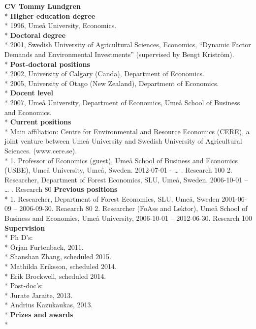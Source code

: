 \documentclass[10pt,a4paper]{article}
\begin{document}
\textbf{CV Tommy Lundgren}\\*
\textbf{Higher education degree}\\*
1996, Umeå University, Economics.\\*
\textbf{Doctoral degree}\\*
2001, Swedish University of Agricultural Sciences, Economics, “Dynamic Factor Demands and Environmental Investments” (supervised by Bengt Kriström).\\*
\textbf{Post-doctoral positions}\\*
2002, University of Calgary (Canda), Department of Economics.\\*
2005, University of Otago (New Zealand), Department of Economics.\\*
\textbf{Docent level}\\*
2007, Umeå University, Department of Economics, Umeå School of Business and Economics.\\*
\textbf{Current positions}\\*
Main affiliation: Centre for Environmental and Resource Economics (CERE), a joint venture between Umeå University and Swedish University of Agricultural Sciences. (www.cere.se).\\*
1. Professor of Economics (guest), Umeå School of Business and Economics (USBE), Umeå University, Umeå, Sweden. 2012-07-01 - …  . Research 100%
2. Researcher, Department of Forest Economics, SLU, Umeå, Sweden. 2006-10-01 – … . Research 80%
\textbf{Previous positions}\\*
1. Researcher, Department of Forest Economics, SLU, Umeå, Sweden 2001-06-09 – 2006-09-30. Reaearch 80%
2. Researcher (FoAss and Lektor), Umeå School of Business and Economics, Umeå University, 2006-10-01 – 2012-06-30. Research 100%
\textbf{Supervision}\\*
Ph D’s:\\*
Örjan Furtenback, 2011.\\*
Shanshan Zhang, scheduled 2015.\\*
Mathilda Eriksson, scheduled 2014.\\*
Erik Brockwell, scheduled 2014.\\*
Post-doc’s:\\*
Jurate Jaraite, 2013.\\*
Andrius Kazukaukas, 2013.\\*
\textbf{Prizes and awards}\\*
\end{document}

